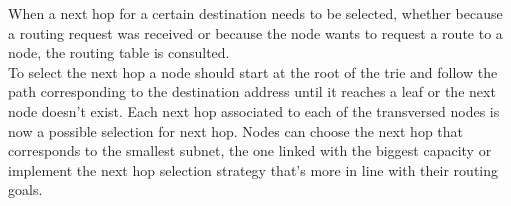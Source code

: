 When a next hop for a certain destination needs to be selected, whether because a routing request was received or because the node wants to request a route to a node, the routing table is consulted. \\
To select the next hop a node should start at the root of the trie and follow the path corresponding to the destination address until it reaches a leaf or the next node doesn't exist. Each next hop associated to each of the transversed nodes is now a possible selection for next hop. Nodes can choose the next hop that corresponds to the smallest subnet, the one linked with the biggest capacity or implement the next hop selection strategy that's more in line with their routing goals.